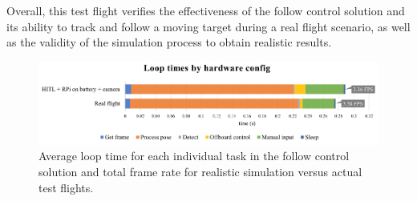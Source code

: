 Overall, this test flight verifies the effectiveness of the follow control solution and its ability to track and follow a moving target during a real flight scenario, as well as the validity of the simulation process to obtain realistic results.


\begin{figure}
  \centering
  \includegraphics[width=\textwidth, keepaspectratio]{img/perf-hitl-flight.png}
  \caption{Average loop time for each individual task in the follow control solution and total frame rate for realistic simulation versus actual test flights.}
  \label{fig:flight-performance}
\end{figure}
